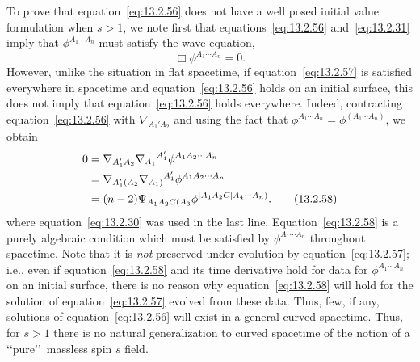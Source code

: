 To prove that equation~\eqref{eq:13.2.56} does not have a well posed initial value
formulation when \(s>1\), we note first that equations~\eqref{eq:13.2.56}
and~\eqref{eq:13.2.31} imply that \(\phi^{A_1\cdots A_n}\) must satisfy the wave
equation,
\begin{equation}
  \Box\phi^{A_1\cdots A_n}=0.
  \tag{13.2.57}\label{eq:13.2.57}
\end{equation}
However, unlike the situation in flat spacetime, if equation~\eqref{eq:13.2.57} is
satisfied everywhere in spacetime and equation~\eqref{eq:13.2.56} holds on an
initial surface, this does not imply that equation~\eqref{eq:13.2.56} holds
everywhere. Indeed, contracting equation~\eqref{eq:13.2.56} with
\(\nabla_{A_1'A_2}\) and using the fact that
\(\phi^{A_1\cdots A_n}=\phi^{(A_1\cdots A_n)}\), we obtain
\begin{align}
  0
  &={}\nabla_{A_1'A_2}\nabla_{A_1}{}^{A_1'}
    \phi^{A_1A_2\cdots A_n}\notag\\
  &={}\nabla_{A_1'(A_2}\nabla_{A_1)}{}^{A_1'}
    \phi^{A_1A_2\cdots A_n}\notag\\
  &={}(n-2)\Psi_{A_1A_2C(A_3}
    \phi^{\lvert A_1A_2C\rvert A_4\cdots A_n)}.
  \tag{13.2.58}\label{eq:13.2.58}
\end{align}
where equation~\eqref{eq:13.2.30} was used in the last line. Equation~\eqref{eq:13.2.58}
is a purely algebraic condition which must be satisfied by
\(\phi^{A_1\cdots A_n}\) throughout spacetime. Note that it is \emph{not}
preserved under evolution by equation~\eqref{eq:13.2.57}; i.e., even if
equation~\eqref{eq:13.2.58} and its time derivative hold for data for
\(\phi^{A_1\cdots A_n}\) on an initial surface, there is no reason why
equation~\eqref{eq:13.2.58} will hold for the solution of equation~\eqref{eq:13.2.57}
evolved from these data. Thus, few, if any, solutions of equation~\eqref{eq:13.2.56}
will exist in a general curved spacetime. Thus, for \(s>1\) there is no natural
generalization to curved spacetime of the notion of a \lq\lq pure\rq\rq\ massless
spin \(s\) field.
